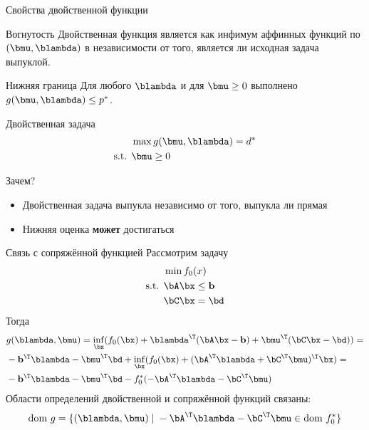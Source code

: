 \documentclass[12pt,russian]{beamer}
\begin{document}
\begin{frame}{Свойства двойственной функции}
\small
\begin{block}{Вогнутость}
Двойственная функция является {\color{red}{вогнутой}} как инфимум аффинных функций по $(\bmu, \blambda)$ в независимости от того, является ли исходная задача выпуклой.
\end{block}

\begin{block}{Нижняя граница}
Для любого $\blambda$ и для $\bmu \geq 0$ выполнено $g(\bmu, \blambda) \leq p^*$.
\end{block}

\begin{block}{Двойственная задача}
\vspace{-5mm}
\begin{equation*}
\begin{split}
& \max g(\bmu, \blambda) = d^*\\
\text{s.t. } & \bmu \geq 0
\end{split}
\end{equation*}
\end{block}

\begin{block}{Зачем?}
\begin{itemize}
\vspace{-2mm}
\item Двойственная задача выпукла независимо от того, выпукла ли прямая
\vspace{-3mm}
\item Нижняя оценка \textbf{может} достигаться
\end{itemize}
\end{block}
\end{frame}

\begin{frame}{Связь с сопряжённой функцией}
Рассмотрим задачу
\begin{equation*}
\begin{split}
&\min f_0(x) \\
\text{s.t. } & \bA\bx \leq \mathbf{b}\\
& \bC\bx = \bd
\end{split}
\end{equation*}
Тогда
\begin{equation*}
\begin{split}
& g(\blambda, \bmu) = \inf_{\bx} (f_0(\bx) + \blambda^{\T}(\bA\bx - \mathbf{b}) + \bmu^{\T}(\bC\bx - \bd)) = \\
& - \mathbf{b}^{\T}\blambda - \bmu^{\T}\bd + \inf_{\bx}(f_0(\bx) + (\bA^{\T}\blambda + \bC^{\T}\bmu)^{\T}\bx) = \\
& - \mathbf{b}^{\T}\blambda - \bmu^{\T}\bd - f_0^*(-\bA^{\T}\blambda - \bC^{\T}\bmu)
\end{split}
\end{equation*}
Области определений двойственной и сопряжённой функций связаны:
\[
\text{dom } g = \{ (\blambda, \bmu) \; | \; -\bA^{\T}\blambda - \bC^{\T}\bmu \in \text{dom } f^*_0 \}
\] 
\end{frame}
\end{document}
